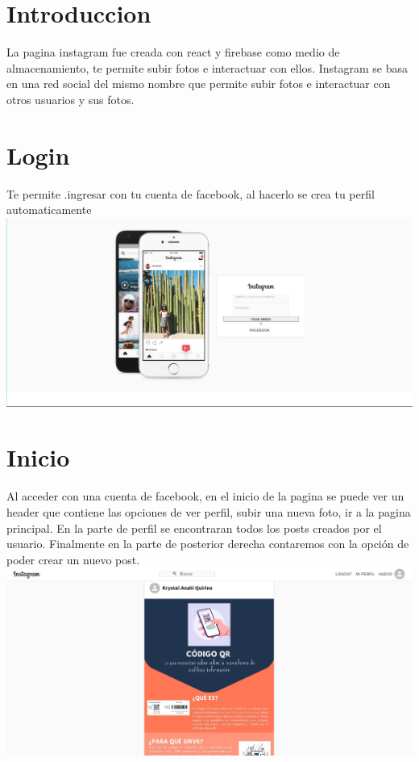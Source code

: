 \documentclass[12pt,a4paper]{article}
\begin{document}
	
	\vspace{1 cm}
	\section{Introduccion}
	
	La pagina instagram fue creada con react y firebase como medio de almacenamiento, te permite subir fotos e interactuar con ellos. Instagram se basa en una red social del mismo nombre que permite subir fotos e interactuar con otros usuarios y sus fotos.\\
	
	\section{Login}
	Te permite .ingresar con tu cuenta de facebook, al hacerlo se crea tu perfil automaticamente\\
	
	\includegraphics[scale=0.20]{Login}
	
	\section{Inicio}
	Al acceder con una cuenta de facebook, en el inicio de la pagina se puede ver un header que contiene las opciones de ver perfil, subir una nueva foto, ir a la pagina principal. En la parte de perfil se encontraran todos los posts creados por el usuario. Finalmente en la parte de posterior derecha contaremos con la opción de poder crear un nuevo post.\\
	
	\includegraphics[scale=0.20]{Inicio1}	
	
\end{document}
